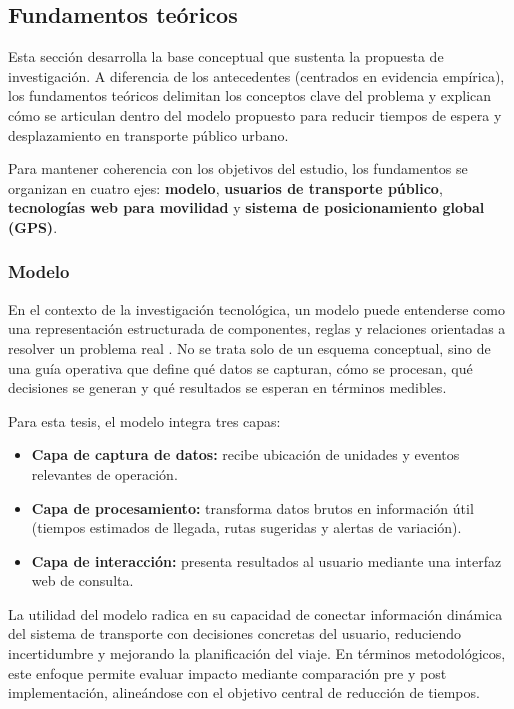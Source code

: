 \subsection{Fundamentos teóricos}

Esta sección desarrolla la base conceptual que sustenta la propuesta de investigación. A diferencia de los antecedentes (centrados en evidencia empírica), los fundamentos teóricos delimitan los conceptos clave del problema y explican cómo se articulan dentro del modelo propuesto para reducir tiempos de espera y desplazamiento en transporte público urbano.

Para mantener coherencia con los objetivos del estudio, los fundamentos se organizan en cuatro ejes: \textbf{modelo}, \textbf{usuarios de transporte público}, \textbf{tecnologías web para movilidad} y \textbf{sistema de posicionamiento global (GPS)}.

\subsubsection{Modelo}

En el contexto de la investigación tecnológica, un modelo puede entenderse como una representación estructurada de componentes, reglas y relaciones orientadas a resolver un problema real \cite{pressman2005}. No se trata solo de un esquema conceptual, sino de una guía operativa que define qué datos se capturan, cómo se procesan, qué decisiones se generan y qué resultados se esperan en términos medibles.

Para esta tesis, el modelo integra tres capas:
\begin{itemize}
    \item \textbf{Capa de captura de datos:} recibe ubicación de unidades y eventos relevantes de operación.
    \item \textbf{Capa de procesamiento:} transforma datos brutos en información útil (tiempos estimados de llegada, rutas sugeridas y alertas de variación).
    \item \textbf{Capa de interacción:} presenta resultados al usuario mediante una interfaz web de consulta.
\end{itemize}

La utilidad del modelo radica en su capacidad de conectar información dinámica del sistema de transporte con decisiones concretas del usuario, reduciendo incertidumbre y mejorando la planificación del viaje. En términos metodológicos, este enfoque permite evaluar impacto mediante comparación pre y post implementación, alineándose con el objetivo central de reducción de tiempos.

